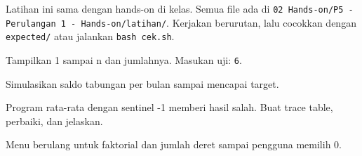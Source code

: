 \documentclass[a4paper]{article}
\begin{document}
Latihan ini sama dengan hands-on di kelas. Semua file ada di \texttt{02 Hands-on/P5 - Perulangan 1 - Hands-on/latihan/}. Kerjakan berurutan, lalu cocokkan dengan \texttt{expected/} atau jalankan \texttt{bash cek.sh}.
\par\vspace{4pt}\par\vspace{6pt}
Tampilkan 1 sampai n dan jumlahnya. Masukan uji: \texttt{6}.

Simulasikan saldo tabungan per bulan sampai mencapai target.

Program rata-rata dengan sentinel -1 memberi hasil salah. Buat trace table, perbaiki, dan jelaskan.

Menu berulang untuk faktorial dan jumlah deret sampai pengguna memilih 0.
\end{document}
